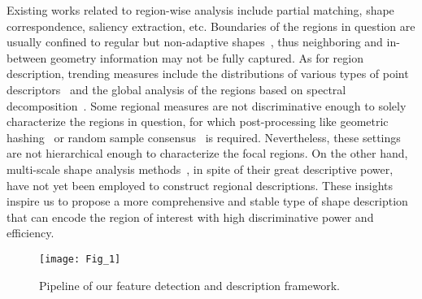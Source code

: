 Existing works related to region-wise analysis include partial matching,
shape correspondence, saliency extraction, etc. Boundaries of the regions
in question are usually confined to regular but non-adaptive
shapes~\cite{Kazhdan:2003,Mortara:03,Gatzke:2005,Kokkinos:2012}, thus
neighboring and in-between geometry information may not be fully captured.
As for region description, trending measures include the distributions of
various types of point
descriptors~\cite{Osada:2002,Ben-Chen:2008,Liu:2006} and the global
analysis of the regions based on spectral
decomposition~\cite{Hu2009,Lavoue:2012}. Some regional measures are
not discriminative enough to solely characterize the regions in question,
for which post-processing like geometric
hashing~\cite{Yehezkel:1988} or random sample
consensus~\cite{Fischler:1981} is required. Nevertheless, these settings
are not hierarchical enough to characterize the focal regions. On the
other hand, multi-scale shape analysis
methods~\cite{Rustamov2011,Sun:2009:CGF}, in spite of their great
descriptive power, have not yet been employed to construct regional
descriptions. These insights inspire us to propose a more comprehensive
and stable type of shape description that can encode the region of
interest with high discriminative power and efficiency.


\begin{figure}[!to]
\begin{center}
\texttt{[image: Fig\_1]}
\end{center}
\caption[Pipeline of our generalized feature detection framework.]
{Pipeline of our feature detection and description framework.}
\label{pipeline}
\end{figure}

